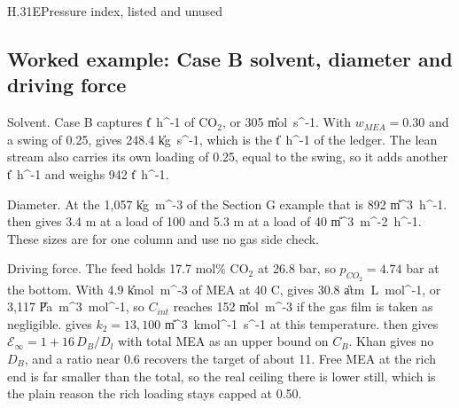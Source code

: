 \begin{eqcard}{H.31}{E}{Pressure index, listed and unused}
\end{eqcard}

\subsection*{Worked example: Case B solvent, diameter and driving force}
Solvent. Case B captures \vMcotwoB{} \U{t\ h^{-1}} of CO$_2$, or 305 \U{mol\ s^{-1}}. With $w_{MEA}=0.30$ and a swing of 0.25,  gives 248.4 \U{kg\ s^{-1}}, which is the \vMsolvB{} \U{t\ h^{-1}} of the ledger. The lean stream also carries its own loading of 0.25, equal to the swing, so it adds another \vMcotwoB{} \U{t\ h^{-1}} and weighs 942 \U{t\ h^{-1}}.

Diameter. At the 1,057 \U{kg\ m^{-3}} of the Section G example that is 892 \U{m^3\ h^{-1}}.  then gives 3.4 m at a load of 100 and 5.3 m at a load of 40 \U{m^3\ m^{-2}\ h^{-1}}. These sizes are for one column and use no gas side check.

Driving force. The feed holds 17.7 mol\% CO$_2$ at 26.8 bar, so $p_{CO_2}=4.74$ bar at the bottom. With 4.9 \U{kmol\ m^{-3}} of MEA at 40 C,  gives 30.8 \U{atm\ L\ mol^{-1}}, or 3,117 \U{Pa\ m^3\ mol^{-1}}, so $C_{int}$ reaches 152 \U{mol\ m^{-3}} if the gas film is taken as negligible.  gives $k_2=13{,}100$ \U{m^3\ kmol^{-1}\ s^{-1}} at this temperature.  then gives $\mathcal E_\infty=1+16\,D_B/D_l$ with total MEA as an upper bound on $C_B$. Khan gives no $D_B$, and a ratio near 0.6 recovers the target of about 11. Free MEA at the rich end is far smaller than the total, so the real ceiling there is lower still, which is the plain reason the rich loading stays capped at 0.50.

